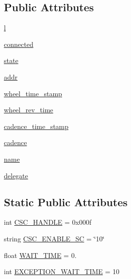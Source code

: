 \subsection*{Public Attributes}
\begin{DoxyCompactItemize}
\item 
\hyperlink{classble__sc_1_1ble__sc_abb5cd42cfd059b02e9bbde16ca692aca}{l}
\item 
\hyperlink{classble__sc_1_1ble__sc_a7febc900c7ebe07ef23edea4bf736b6d}{connected}
\item 
\hyperlink{classble__sc_1_1ble__sc_af56b72b355ef5e792a0287ebffce36ff}{state}
\item 
\hyperlink{classble__sc_1_1ble__sc_afa92ff7157c4bdf0af9755643135f930}{addr}
\item 
\hyperlink{classble__sc_1_1ble__sc_ad24e9283f4f1dea4a26d8ce1ad1035ce}{wheel\+\_\+time\+\_\+stamp}
\item 
\hyperlink{classble__sc_1_1ble__sc_adb16b829976874cd3e8908f550d60b6d}{wheel\+\_\+rev\+\_\+time}
\item 
\hyperlink{classble__sc_1_1ble__sc_ae56d6dc864f7514593ada1a67d3bba0f}{cadence\+\_\+time\+\_\+stamp}
\item 
\hyperlink{classble__sc_1_1ble__sc_a9f5a63641420b643213f0559edb2790f}{cadence}
\item 
\hyperlink{classble__sc_1_1ble__sc_a771332ac7fe0fd02cf9c0373f993f785}{name}
\item 
\hyperlink{classble__sc_1_1ble__sc_a01f09adb9eaf400be64de2a8a0ec3044}{delegate}
\end{DoxyCompactItemize}
\subsection*{Static Public Attributes}
\begin{DoxyCompactItemize}
\item 
int \hyperlink{classble__sc_1_1ble__sc_a67d10b5658a576b2e50667fc3741b0dc}{C\+S\+C\+\_\+\+H\+A\+N\+D\+LE} = 0x000f
\item 
string \hyperlink{classble__sc_1_1ble__sc_a6b2fe95bf3346e236e96efd5fdfafd5c}{C\+S\+C\+\_\+\+E\+N\+A\+B\+L\+E\+\_\+\+SC} = \char`\"{}10\char`\"{}
\item 
float \hyperlink{classble__sc_1_1ble__sc_a7c1e25208c6e93d5bd9fd4f8eafc4833}{W\+A\+I\+T\+\_\+\+T\+I\+ME} = 0.
\item 
int \hyperlink{classble__sc_1_1ble__sc_a0c45928e56f439c14eab8356c16cc6cc}{E\+X\+C\+E\+P\+T\+I\+O\+N\+\_\+\+W\+A\+I\+T\+\_\+\+T\+I\+ME} = 10
\end{DoxyCompactItemize}


